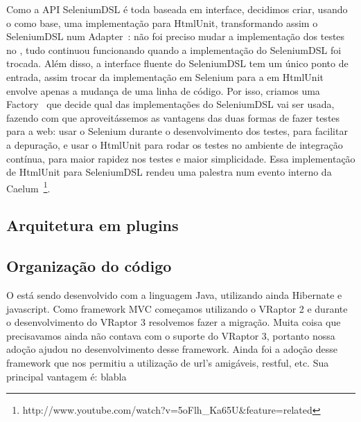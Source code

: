 Como a API SeleniumDSL é toda baseada em interface, decidimos criar, usando o \calopsita como base, uma implementação para
HtmlUnit, transformando assim o SeleniumDSL num Adapter~\cite{gof}: não foi preciso mudar a implementação dos testes no 
\calopsita, tudo continuou funcionando quando a implementação do SeleniumDSL foi trocada. Além disso, a interface fluente
do SeleniumDSL tem um único ponto de entrada, assim trocar da implementação em Selenium para a em HtmlUnit envolve apenas
a mudança de uma linha de código. Por isso, criamos uma Factory~\cite{gof} que decide qual das implementações do SeleniumDSL
vai ser usada, fazendo com que aproveitássemos as vantagens das duas formas de fazer testes para a web: usar o Selenium 
durante o desenvolvimento dos testes, para facilitar a depuração, e usar o HtmlUnit para rodar os testes no ambiente de
integração contínua, para maior rapidez nos testes e maior simplicidade. Essa implementação de HtmlUnit
para SeleniumDSL rendeu uma palestra num evento interno da Caelum~\footnote{http://www.youtube.com/watch?v=5oFlh\_Ka65U\&feature=related}.

\subsection{Arquitetura em plugins}



\subsection{Organização do código}



O \calopsita está sendo desenvolvido com a linguagem Java, utilizando ainda Hibernate e javascript. Como 
framework MVC começamos utilizando o VRaptor 2 e durante o desenvolvimento do VRaptor 3 resolvemos fazer a migração. 
Muita coisa que precisavamos ainda não contava com o suporte do VRaptor 3, portanto nossa adoção ajudou no 
desenvolvimento desse framework. Ainda foi a adoção desse framework que nos permitiu a utilização de url's 
amigáveis, restful, etc. Sua principal vantagem é: blabla
